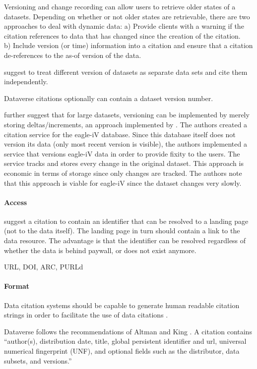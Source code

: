 \documentclass[a4paper,10pt]{article}
\begin{document}
Versioning and change recording can allow users to retrieve older states of a datasets. Depending on whether or not older states are retrievable, there are two approaches to deal with dynamic data:
a) Provide clients with a warning if the citation references to data that has changed since the creation of the citation. \\ 
b) Include version (or time) information into a citation and ensure that a citation de-references to the as-of version of the data.

\citep{AltKin07} suggest to treat different version of datasets as separate data sets and cite them independently.

Dataverse \citep{Crosas2011} citations optionally can contain a dataset version number.

\citep{AltKin07} further suggest that for large datasets, versioning can be implemented by merely storing deltas/increments, an approach implemented by \citep{Alawini2017}. The authors created a citation service for the eagle-iV database. Since this database itself does not version its data (only most recent version is visible), the authors implemented a service that versions eagle-iV data in order to provide fixity to the users. The service tracks and stores every change in the original dataset. This approach is economic in terms of storage since only changes are tracked. The authors note that this approach is viable for eagle-iV since the dataset changes very slowly.


\paragraph{Access}
\citep{AltKin07} suggest a citation to contain an identifier that can be resolved to a landing page (not to the data itself). The landing page in turn should contain a link to the data resource. The advantage is that the identifier can be resolved regardless of whether the data is behind paywall, or does not exist anymore.

URL, DOI, ARC, PURLd

\paragraph{Format}
Data citation systems should be capable to generate human readable citation strings in order to facilitate the use of data citations \cite{Buneman2016}.

Dataverse \citep{Crosas2011} follows the recommendations of Altman and King \citep{AltKin07}.
A citation contains ``author(s), distribution date, title, global persistent identifier and url, universal numerical fingerprint (UNF), and optional fields such as the distributor, data subsets, and versions.''
\end{document}
